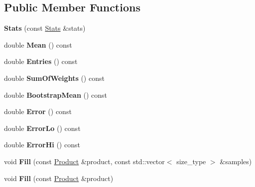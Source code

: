 \subsection*{Public Member Functions}
\begin{DoxyCompactItemize}
\item 
\mbox{\label{classQn_1_1Stats_aec0c9649237a42e5a2e8aad0c3013a53}} 
{\bfseries Stats} (const \mbox{\hyperlink{classQn_1_1Stats}{Stats}} \&stats)
\item 
\mbox{\label{classQn_1_1Stats_a341d9eefae6c8d6aff2e4cd0545c4e7d}} 
double {\bfseries Mean} () const
\item 
\mbox{\label{classQn_1_1Stats_a7216669667eb98c18d39ee8a585c1b08}} 
double {\bfseries Entries} () const
\item 
\mbox{\label{classQn_1_1Stats_affd9c5ce5394c67f2956357fa1f32c4b}} 
double {\bfseries Sum\+Of\+Weights} () const
\item 
\mbox{\label{classQn_1_1Stats_a25945cf2ade228692de2ad77ad9e9b4f}} 
double {\bfseries Bootstrap\+Mean} () const
\item 
\mbox{\label{classQn_1_1Stats_a81b53377f3c3e552a61ce68066d9df62}} 
double {\bfseries Error} () const
\item 
\mbox{\label{classQn_1_1Stats_a203d781c5dcf2c71830bf27552641109}} 
double {\bfseries Error\+Lo} () const
\item 
\mbox{\label{classQn_1_1Stats_a9edeb4ae851cb65b88edf86fdb44a7ee}} 
double {\bfseries Error\+Hi} () const
\item 
\mbox{\label{classQn_1_1Stats_a93e827d04d9346eb47e88fbefdf402b5}} 
void {\bfseries Fill} (const \mbox{\hyperlink{structQn_1_1Product}{Product}} \&product, const std\+::vector$<$ size\+\_\+type $>$ \&samples)
\item 
\mbox{\label{classQn_1_1Stats_a6da09fa10e3e884d5633248b42c3a0fc}} 
void {\bfseries Fill} (const \mbox{\hyperlink{structQn_1_1Product}{Product}} \&product)

\end{DoxyCompactItemize}
